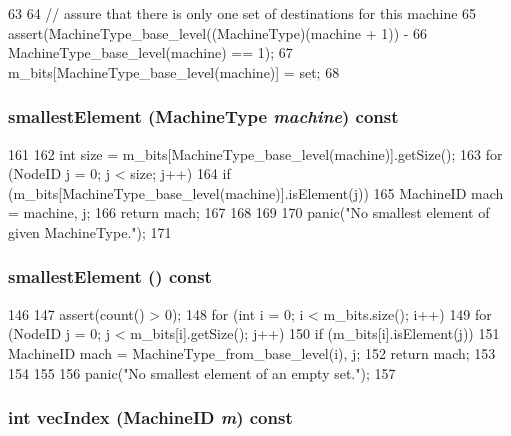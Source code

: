 \begin{DoxyCode}
63 {
64     // assure that there is only one set of destinations for this machine
65     assert(MachineType_base_level((MachineType)(machine + 1)) -
66            MachineType_base_level(machine) == 1);
67     m_bits[MachineType_base_level(machine)] = set;
68 }
\end{DoxyCode}
\hypertarget{classNetDest_a9ef07d7ecdc0b533221760be92a9865d}{
\subsubsection[{smallestElement}]{ smallestElement (MachineType {\em machine}) const}}
\label{classNetDest_a9ef07d7ecdc0b533221760be92a9865d}



\begin{DoxyCode}
161 {
162     int size = m_bits[MachineType_base_level(machine)].getSize();
163     for (NodeID j = 0; j < size; j++) {
164         if (m_bits[MachineType_base_level(machine)].isElement(j)) {
165             MachineID mach = {machine, j};
166             return mach;
167         }
168     }
169 
170     panic("No smallest element of given MachineType.");
171 }
\end{DoxyCode}
\hypertarget{classNetDest_a73f74fff96db0012ec8044ba80b48a8b}{
\subsubsection[{smallestElement}]{ smallestElement () const}}
\label{classNetDest_a73f74fff96db0012ec8044ba80b48a8b}



\begin{DoxyCode}
146 {
147     assert(count() > 0);
148     for (int i = 0; i < m_bits.size(); i++) {
149         for (NodeID j = 0; j < m_bits[i].getSize(); j++) {
150             if (m_bits[i].isElement(j)) {
151                 MachineID mach = {MachineType_from_base_level(i), j};
152                 return mach;
153             }
154         }
155     }
156     panic("No smallest element of an empty set.");
157 }
\end{DoxyCode}
\hypertarget{classNetDest_a83881a62959b057cd15b888a8c61c7e6}{
\subsubsection[{vecIndex}]{\setlength{\rightskip}{0pt plus 5cm}int vecIndex ({\bf MachineID} {\em m}) const}}
\label{classNetDest_a83881a62959b057cd15b888a8c61c7e6}



